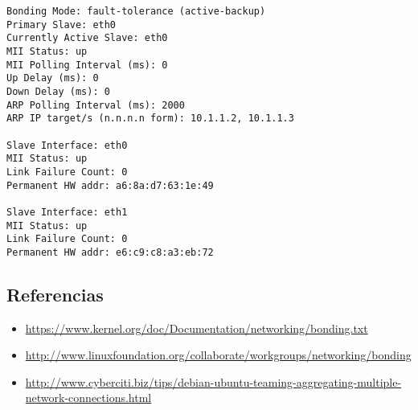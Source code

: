 \begin{itemize}
\begin{lstlisting}
Bonding Mode: fault-tolerance (active-backup)
Primary Slave: eth0
Currently Active Slave: eth0
MII Status: up
MII Polling Interval (ms): 0
Up Delay (ms): 0
Down Delay (ms): 0
ARP Polling Interval (ms): 2000
ARP IP target/s (n.n.n.n form): 10.1.1.2, 10.1.1.3

Slave Interface: eth0
MII Status: up
Link Failure Count: 0
Permanent HW addr: a6:8a:d7:63:1e:49

Slave Interface: eth1
MII Status: up
Link Failure Count: 0
Permanent HW addr: e6:c9:c8:a3:eb:72
\end{lstlisting}
\end{itemize}



\subsection{Referencias}
\begin{itemize}
	\item \url{https://www.kernel.org/doc/Documentation/networking/bonding.txt}
	\item \url{http://www.linuxfoundation.org/collaborate/workgroups/networking/bonding}
	\item \url{http://www.cyberciti.biz/tips/debian-ubuntu-teaming-aggregating-multiple-network-connections.html}
\end{itemize}
